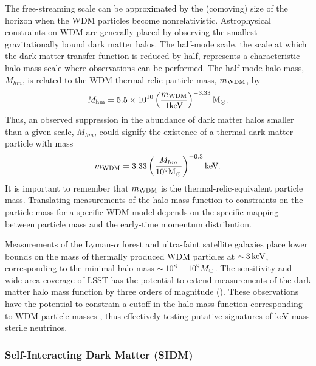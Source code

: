 The free-streaming scale can be approximated by the (comoving) size of the horizon when the WDM particles become nonrelativistic. 
Astrophysical constraints on WDM are generally placed by observing the smallest gravitationally bound dark matter halos.  
The half-mode scale, the scale at which the dark matter transfer function is reduced by half, represents a characteristic halo mass scale where observations can be performed. 
The half-mode halo mass, $M_{hm}$, is related to the WDM thermal relic particle mass, $m_{\rm WDM}$, by \citep[\eg][]{Bullock:2017xww}
\begin{equation} \label{eqn:Mhm}
    M_{\rm hm} = 5.5 \times 10^{10} \left( \frac{m_{\rm WDM}}{1 {\rm keV}} \right)^{-3.33} {\rm M_\odot}.
\end{equation}
Thus, an observed suppression in the abundance of dark matter halos smaller than a given scale, $M_{hm}$, could signify the existence of a thermal dark matter particle with mass
\begin{equation}
    m_{\rm WDM} =  3.33 \left(\frac{M_{hm}}{10^{9} {\rm M_\odot}} \right)^{-0.3} {\rm keV}.
\end{equation}
It is important to remember that $m_{\rm WDM}$ is the thermal-relic-equivalent particle mass. Translating measurements of the halo mass function to constraints on the particle mass for a specific WDM model depends on the specific mapping between particle mass and the early-time momentum distribution.

Measurements of the Lyman-$\alpha$ forest \citep[\eg][]{Viel:2013,2017PhRvD..96b3522I} and ultra-faint satellite galaxies \citep[\eg][]{Jethwa:2018,Kim:2017iwr,Nadler:2018}  place lower bounds on the mass of thermally produced WDM particles at $ {\sim}\, 3\mathrm{\,keV}$, corresponding to the minimal halo mass $ {\sim}\, 10^8-10^9 M_\odot$.
The sensitivity and wide-area coverage of LSST has the potential to extend measurements of the dark matter halo mass function by three orders of magnitude (). 
These observations have the potential to constrain a cutoff in the halo mass function corresponding to WDM particle masses , thus effectively testing putative signatures of keV-mass sterile neutrinos.


\subsubsection{Self-Interacting Dark Matter (SIDM)}
\label{sec:sidm}

